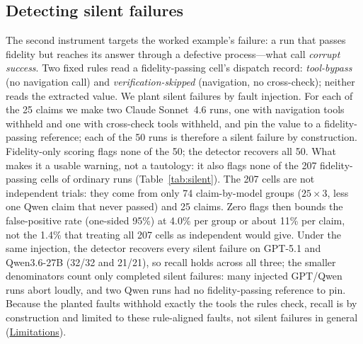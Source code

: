 \documentclass[11pt]{article}
\begin{document}
\subsection{Detecting silent failures}
\label{sec:res-silent}
The second instrument targets the worked example's failure: a run that
passes fidelity but reaches its answer through a defective
process---what \citet{cao2026corruptsuccess} call \emph{corrupt
success}. Two fixed rules read a fidelity-passing cell's dispatch
record: \emph{tool-bypass} (no navigation call) and
\emph{verification-skipped} (navigation, no cross-check); neither reads
the extracted value. We plant silent failures by fault injection. For
each of the 25 claims we make two Claude Sonnet~4.6 runs, one with
navigation tools withheld and one with cross-check tools withheld, and
pin the value to a fidelity-passing reference; each of the 50 runs is
therefore a silent failure by construction. Fidelity-only scoring flags
none of the 50; the detector recovers all 50. What makes it a usable
warning, not a tautology: it also flags none of the 207 fidelity-passing
cells of ordinary runs (Table~\ref{tab:silent}).
The 207 cells are not independent trials: they come from only 74
claim-by-model groups ($25\times3$, less one Qwen claim that never
passed) and 25 claims. Zero flags then bounds the false-positive rate
(one-sided 95\%) at 4.0\% per group or about 11\% per claim, not the
1.4\% that treating all 207 cells as independent would give.
Under the same injection, the detector recovers every
silent failure on GPT-5.1 and Qwen3.6-27B (32/32 and 21/21), so recall
holds across all three; the smaller denominators count only completed
silent failures: many injected GPT/Qwen runs abort loudly, and two Qwen
runs had no fidelity-passing reference to pin. Because the planted
faults withhold exactly the tools the rules check, recall is by
construction and limited to these rule-aligned faults, not silent
failures in general (\hyperref[sec:limitations]{Limitations}).
\end{document}
